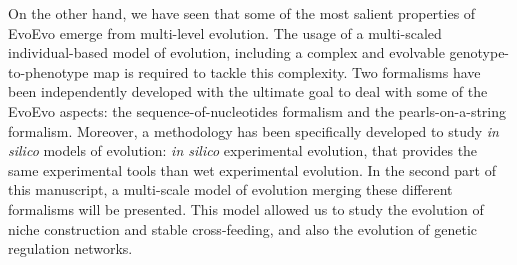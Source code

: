 On the other hand, we have seen that some of the most salient properties of EvoEvo emerge from multi-level evolution. The usage of a multi-scaled individual-based model of evolution, including a complex and evolvable genotype-to-phenotype map is required to tackle this complexity. Two formalisms have been independently developed with the ultimate goal to deal with some of the EvoEvo aspects: the sequence-of-nucleotides formalism and the pearls-on-a-string formalism. Moreover, a methodology has been specifically developed to study \textit{in silico} models of evolution: \textit{in silico} experimental evolution, that provides the same experimental tools than wet experimental evolution. In the second part of this manuscript, a multi-scale model of evolution merging these different formalisms will be presented. This model allowed us to study the evolution of niche construction and stable cross-feeding, and also the evolution of genetic regulation networks.




